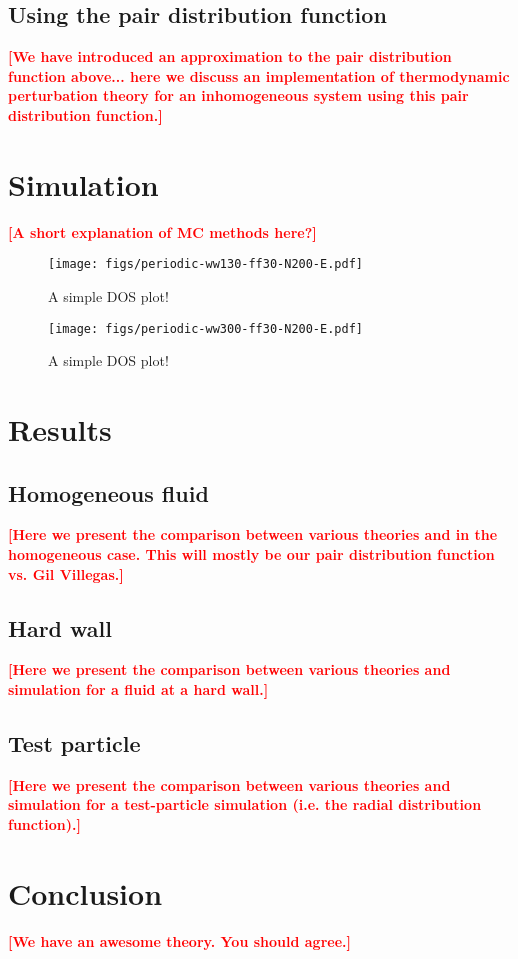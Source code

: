 \documentclass[letterpaper,twocolumn,amsmath,amssymb,pre,aps,10pt]{revtex4-1}
\newcommand\fixme[1]{\textcolor{red}{\textbf{[#1]}}}
\begin{document}
\subsection{Using the pair distribution function}


\fixme{We have introduced an approximation to the pair distribution
  function above... here we discuss an implementation of thermodynamic
  perturbation theory for an inhomogeneous system using this pair
  distribution function.}


\section{Simulation}

\fixme{A short explanation of MC methods here?}

\begin{figure}
  \texttt{[image: figs/periodic-ww130-ff30-N200-E.pdf]}
  \caption{A simple DOS plot!}
\end{figure}

\begin{figure}
  \texttt{[image: figs/periodic-ww300-ff30-N200-E.pdf]}
  \caption{A simple DOS plot!}
\end{figure}

\section{Results}

\subsection{Homogeneous fluid}

\fixme{Here we present the comparison between various theories and in
  the homogeneous case.  This will mostly be our pair distribution
  function vs. Gil Villegas.}

\subsection{Hard wall}

\fixme{Here we present the comparison between various theories and
  simulation for a fluid at a hard wall.}

\subsection{Test particle}

\fixme{Here we present the comparison between various theories and
  simulation for a test-particle simulation (i.e. the radial
  distribution function).}

\section{Conclusion}

\fixme{We have an awesome theory. You should agree.}

\end{document}
